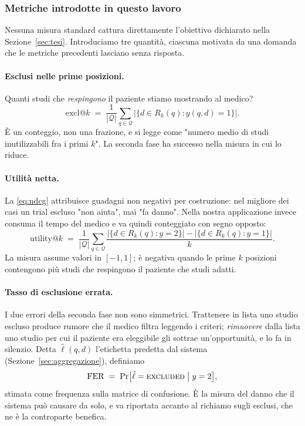 \documentclass[pdflatex,sn-mathphys-num]{sn-jnl}
\theoremstyle{thmstyleone}
\theoremstyle{thmstyletwo}
\theoremstyle{thmstylethree}
\begin{document}
\subsubsection{Metriche introdotte in questo lavoro}\label{sec:metriche-nostre}

Nessuna misura standard cattura direttamente l'obiettivo dichiarato nella Sezione~\ref{sec:tesi}. Introduciamo tre quantità, ciascuna motivata da una domanda che le metriche precedenti lasciano senza risposta.

\paragraph{Esclusi nelle prime posizioni.} Quanti studi che \emph{respingono} il paziente stiamo mostrando al medico?
\begin{equation}
  \mathrm{excl@}k \;=\; \frac{1}{|\mathcal{Q}|}\sum_{q \in \mathcal{Q}} \big|\{d \in R_k(q) : y(q,d) = 1\}\big|.
  \label{eq:exclk}
\end{equation}
È un conteggio, non una frazione, e si legge come "numero medio di studi inutilizzabili fra i primi $k$". La seconda fase ha successo nella misura in cui lo riduce.

\paragraph{Utilità netta.} La \eqref{eq:ndcg} attribuisce guadagni non negativi per costruzione: nel migliore dei casi un trial escluso "non aiuta", mai "fa danno". Nella nostra applicazione invece consuma il tempo del medico e va quindi conteggiato con segno opposto:
\begin{equation}
  \mathrm{utility@}k \;=\; \frac{1}{|\mathcal{Q}|}\sum_{q \in \mathcal{Q}} \frac{\big|\{d \in R_k(q): y = 2\}\big| - \big|\{d \in R_k(q): y = 1\}\big|}{k}.
  \label{eq:utility}
\end{equation}
La misura assume valori in $[-1,1]$; è negativa quando le prime $k$ posizioni contengono più studi che respingono il paziente che studi adatti.

\paragraph{Tasso di esclusione errata.} I due errori della seconda fase non sono simmetrici. Trattenere in lista uno studio escluso produce rumore che il medico filtra leggendo i criteri; \emph{rimuovere} dalla lista uno studio per cui il paziente era eleggibile gli sottrae un'opportunità, e lo fa in silenzio. Detta $\hat{\ell}(q,d)$ l'etichetta predetta dal sistema (Sezione~\ref{sec:aggregazione}), definiamo
\begin{equation}
  \mathrm{FER} \;=\; \Pr\!\big[\hat{\ell} = \textsc{excluded} \;\big|\; y = 2\big],
  \label{eq:fer}
\end{equation}
stimata come frequenza sulla matrice di confusione. È la misura del danno che il sistema può causare da solo, e va riportata accanto al richiamo sugli esclusi, che ne è la controparte benefica.
\end{document}
